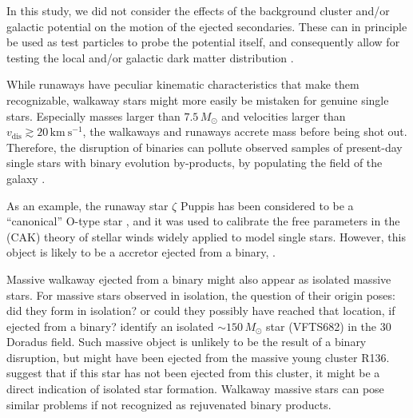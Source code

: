 \documentclass{aa}
\begin{document}
In this study, we did not consider the effects of the background
cluster and/or galactic potential on the motion of the ejected
secondaries. These can in principle be used as test particles to probe
the potential itself, and consequently allow for testing the local
and/or galactic dark matter distribution \citep[e.g.,][]{rossi:14,marchetti:17}.

While runaways have peculiar kinematic %
characteristics that make them recognizable, walkaway stars might more
easily be mistaken for genuine single stars. Especially masses larger
than $7.5\,M_\odot$ and velocities larger than $v_\mathrm{dis}\gtrsim20\,\mathrm{km\
  s^{-1}}$, the walkaways and runaways accrete mass before being shot
out. Therefore, the disruption
of binaries can
pollute observed samples of
present-day single stars with binary evolution by-products, by populating the field of the galaxy
\citep[][]{gvaramadze:12,demink:14}.

As an example, the runaway star $\zeta$ Puppis has been considered to be
a ``canonical'' O-type star \citep[e.g.][]{ramiaramanantsoa:17}, and
it was used to calibrate the free parameters in the \cite{castor:75}
(CAK) theory of stellar winds \citep[][]{pauldrach:94} widely applied
to model single stars. However, this object is
likely to be a accretor ejected from a binary, \cite{vanrensbergen:96,ramiaramanantsoa:17}.

Massive walkaway ejected from a binary might also appear as isolated
massive stars. For massive stars observed in isolation, the question
of their origin poses: did they form in isolation? or could they
possibly have reached that location, if ejected from a binary? \cite{bestenlehner:11} identify an isolated
$\sim150\,M_\odot$ star (VFTS682) in the 30 Doradus field. Such
massive object is unlikely to be the result of a binary disruption,
but might have been ejected from the massive young cluster
R136. \cite{bestenlehner:11} suggest that if this star has not been
ejected from this cluster, it might be a direct indication of isolated
star formation. Walkaway massive stars can pose similar problems if
not recognized as rejuvenated binary products.
\end{document}
